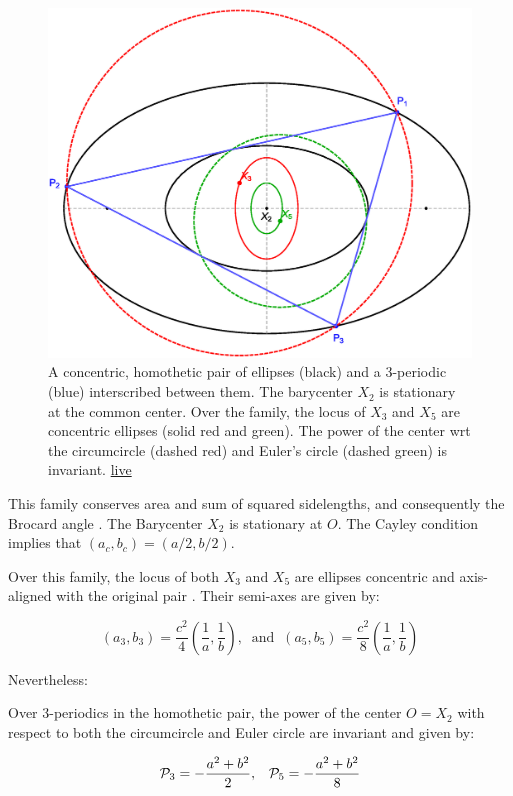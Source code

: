 \begin{figure}
    \centering
    \includegraphics[width=.7\textwidth]{pics/0130_n3_homothetic.eps}
    \caption{A concentric, homothetic pair of ellipses (black) and a 3-periodic (blue) interscribed between them. The barycenter $X_2$ is stationary at the common center. Over the family, the locus of $X_3$ and $X_5$ are concentric ellipses (solid red and green). The power of the center wrt the circumcircle (dashed red) and Euler's circle (dashed green) is invariant. \href{https://bit.ly/3vZEr6W}{live}}
    \label{fig:homothetic}
\end{figure}

This family conserves area and sum of squared sidelengths, and consequently the Brocard angle \cite{reznik2020-similarityII}. The Barycenter $X_2$ is stationary at $O$. The Cayley condition implies that $(a_c,b_c)=(a/2,b/2)$.

Over this family, the locus of both $X_3$ and $X_5$ are ellipses concentric and axis-aligned with the original pair \cite{garcia2020-family-ties}. Their semi-axes are given by:

\[(a_3,b_3)=\frac{c^2}{4}\left(\frac{1}{a},\frac{1}{b}\right),\;\;\text{and}\;\;
	(a_5,b_5)=\frac{c^2}{8}\left(\frac{1}{a},\frac{1}{b}\right) \]


\noindent Nevertheless:

\begin{proposition}
Over 3-periodics in the homothetic pair, the power of the center $O=X_2$ with respect to both the circumcircle and Euler circle are invariant and given by:

\[ 
\P_3 = -\frac{a^2+b^2}{2},\;\;\;\P_5=-\frac{a^2+b^2}{8} \]
\end{proposition} 

